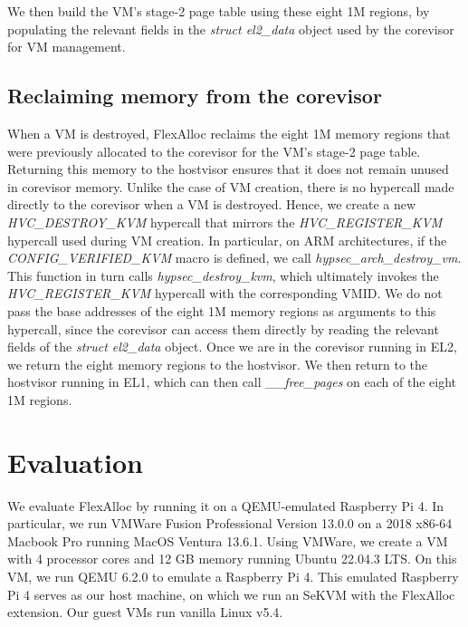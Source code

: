 \noindent We then build the VM's stage-2 page table using these eight 1M regions, by
populating the relevant fields in the \textit{struct el2\_data} object used
by the corevisor for VM management.

\subsection{Reclaiming memory from the corevisor}

When a VM is destroyed, FlexAlloc reclaims the eight 1M memory regions that were
previously allocated to the corevisor for the VM's stage-2 page table. Returning
this memory to the hostvisor ensures that it does not remain unused in corevisor
memory. Unlike the case of VM creation, there is no hypercall made directly to
the corevisor when a VM is destroyed. Hence, we create a new \textit{HVC\_DESTROY\_KVM}
hypercall that mirrors the \textit{HVC\_REGISTER\_KVM} hypercall used during VM
creation. In particular, on ARM architectures, if the \textit{CONFIG\_VERIFIED\_KVM} macro is defined,
we call \textit{hypsec\_arch\_destroy\_vm}. This function in turn calls \textit{hypsec\_destroy\_kvm},
which ultimately invokes the \textit{HVC\_REGISTER\_KVM} hypercall with the corresponding
VMID. We do not pass the base addresses of the eight 1M memory regions as arguments
to this hypercall, since the corevisor can access them directly by reading the
relevant fields of the \textit{struct el2\_data} object. Once we are in the
corevisor running in EL2, we return the eight memory regions to the hostvisor.
We then return to the hostvisor running in EL1, which can then call \textit{\_\_free\_pages}
on each of the eight 1M regions.

\section{Evaluation}

We evaluate FlexAlloc by running it on a QEMU-emulated Raspberry Pi 4. In
particular, we run VMWare Fusion Professional Version 13.0.0 on a 2018 x86-64 Macbook
Pro running MacOS Ventura 13.6.1. Using VMWare, we create a VM
with 4 processor cores and 12 GB memory running Ubuntu 22.04.3 LTS. On this
VM, we run QEMU 6.2.0 to emulate a Raspberry Pi 4. This emulated Raspberry
Pi 4 serves as our host machine, on which we run an SeKVM with the FlexAlloc
extension. Our guest VMs run vanilla Linux v5.4.

